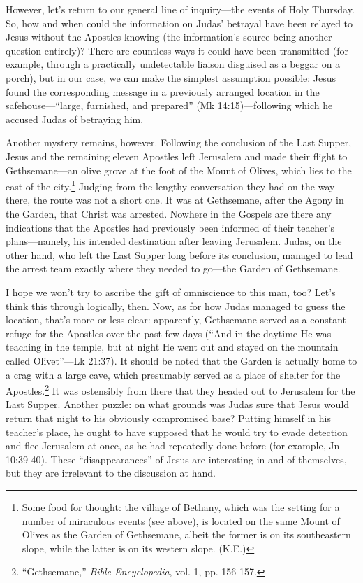 However, let's return to our general line of inquiry---the events of Holy Thursday. So, how and when could the information on Judas' betrayal have been relayed to Jesus without the Apostles knowing (the information's source being another question entirely)? There are countless ways it could have been transmitted (for example, through a practically undetectable liaison disguised as a beggar on a porch), but in our case, we can make the simplest assumption possible: Jesus found the corresponding message in a previously arranged location in the safehouse---``large, furnished, and prepared'' (Mk 14:15)---following which he accused Judas of betraying him.

Another mystery remains, however. Following the conclusion of the Last Supper, Jesus and the remaining eleven Apostles left Jerusalem and made their flight to Gethsemane---an olive grove at the foot of the Mount of Olives, which lies to the east of the city.\footnote{Some food for thought: the village of Bethany, which was the setting for a number of miraculous events (see above), is located on the same Mount of Olives as the Garden of Gethsemane, albeit the former is on its southeastern slope, while the latter is on its western slope. (K.E.)} Judging from the lengthy conversation they had on the way there, the route was not a short one. It was at Gethsemane, after the Agony in the Garden, that Christ was arrested. Nowhere in the Gospels are there any indications that the Apostles had previously been informed of their teacher's plans---namely, his intended destination after leaving Jerusalem. Judas, on the other hand, who left the Last Supper long before its conclusion, managed to lead the arrest team exactly where they needed to go---the Garden of Gethsemane.

I hope we won't try to ascribe the gift of omniscience to this man, too? Let's think this through logically, then. Now, as for how Judas managed to guess the location, that's more or less clear: apparently, Gethsemane served as a constant refuge for the Apostles over the past few days (``And in the daytime He was teaching in the temple, but at night He went out and stayed on the mountain called Olivet''---Lk 21:37). It should be noted that the Garden is actually home to a crag with a large cave, which presumably served as a place of shelter for the Apostles.\footnote{``Gethsemane,'' \emph{Bible Encyclopedia}, vol. 1, pp. 156-157.} It was ostensibly from there that they headed out to Jerusalem for the Last Supper. Another puzzle: on what grounds was Judas sure that Jesus would return that night to his obviously compromised base? Putting himself in his teacher's place, he ought to have supposed that he would try to evade detection and flee Jerusalem at once, as he had repeatedly done before (for example, Jn 10:39-40). These ``disappearances'' of Jesus are interesting in and of themselves, but they are irrelevant to the discussion at hand.

